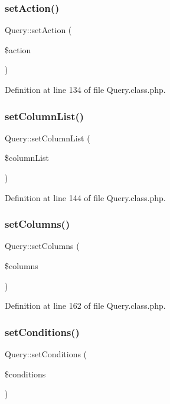 \subsubsection{\texorpdfstring{set\+Action()}{setAction()}}
{\footnotesize\ttfamily Query\+::set\+Action (\begin{DoxyParamCaption}\item[{}]{\$action }\end{DoxyParamCaption})}



Definition at line 134 of file Query.\+class.\+php.

\hypertarget{classQuery_a514b84890d27f9252a9002f562b17654}{}\label{classQuery_a514b84890d27f9252a9002f562b17654} 
\subsubsection{\texorpdfstring{set\+Column\+List()}{setColumnList()}}
{\footnotesize\ttfamily Query\+::set\+Column\+List (\begin{DoxyParamCaption}\item[{}]{\$column\+List }\end{DoxyParamCaption})}



Definition at line 144 of file Query.\+class.\+php.

\hypertarget{classQuery_a2437f6f8524dfc487794270a11778388}{}\label{classQuery_a2437f6f8524dfc487794270a11778388} 
\subsubsection{\texorpdfstring{set\+Columns()}{setColumns()}}
{\footnotesize\ttfamily Query\+::set\+Columns (\begin{DoxyParamCaption}\item[{}]{\$columns }\end{DoxyParamCaption})}



Definition at line 162 of file Query.\+class.\+php.

\hypertarget{classQuery_a5355ddd61a8e4dc129f5f3dd24d39bc9}{}\label{classQuery_a5355ddd61a8e4dc129f5f3dd24d39bc9} 
\subsubsection{\texorpdfstring{set\+Conditions()}{setConditions()}}
{\footnotesize\ttfamily Query\+::set\+Conditions (\begin{DoxyParamCaption}\item[{}]{\$conditions }\end{DoxyParamCaption})}



